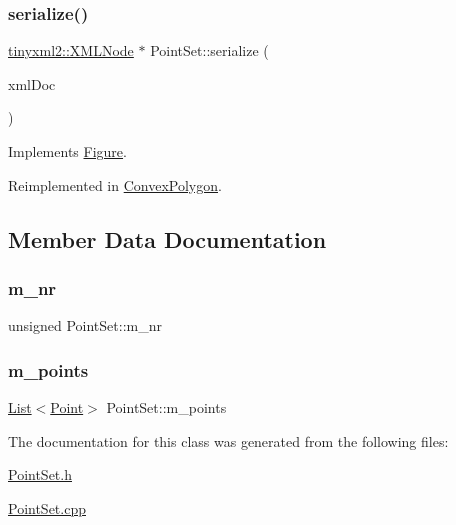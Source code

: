\subsubsection{\texorpdfstring{serialize()}{serialize()}}
{\footnotesize\ttfamily \hyperlink{classtinyxml2_1_1_x_m_l_node}{tinyxml2\+::\+X\+M\+L\+Node} $\ast$ Point\+Set\+::serialize (\begin{DoxyParamCaption}\item[{\hyperlink{classtinyxml2_1_1_x_m_l_document}{tinyxml2\+::\+X\+M\+L\+Document} \&}]{xml\+Doc }\end{DoxyParamCaption})\hspace{0.3cm}{\ttfamily [virtual]}}



Implements \hyperlink{class_figure_a11994f67ee209a46047e0897680f6313}{Figure}.



Reimplemented in \hyperlink{class_convex_polygon_ab7cfd51933dd7a3bf821056c292ca62c}{Convex\+Polygon}.



\subsection{Member Data Documentation}
\mbox{\label{class_point_set_ae2ba098c7108eb3ae954ca7d89a710f3}} 
\subsubsection{\texorpdfstring{m\+\_\+nr}{m\_nr}}
{\footnotesize\ttfamily unsigned Point\+Set\+::m\+\_\+nr\hspace{0.3cm}{\ttfamily [protected]}}

\mbox{\label{class_point_set_a535724e3e1ffabf8d26009e555c32b21}} 
\subsubsection{\texorpdfstring{m\+\_\+points}{m\_points}}
{\footnotesize\ttfamily \hyperlink{class_list}{List}$<$\hyperlink{class_point}{Point}$>$ Point\+Set\+::m\+\_\+points\hspace{0.3cm}{\ttfamily [protected]}}



The documentation for this class was generated from the following files\+:\begin{DoxyCompactItemize}
\item 
\hyperlink{_point_set_8h}{Point\+Set.\+h}\item 
\hyperlink{_point_set_8cpp}{Point\+Set.\+cpp}\end{DoxyCompactItemize}
